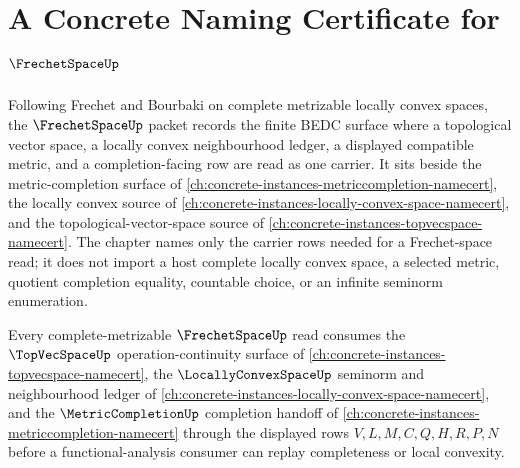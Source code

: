 \chapter{A Concrete Naming Certificate for $\FrechetSpaceUp$}
\label{ch:concrete-instances-frechet-space-namecert}

Following Frechet and Bourbaki on complete metrizable locally convex spaces, the $\FrechetSpaceUp$ packet records the finite BEDC surface where a topological vector space, a locally convex neighbourhood ledger, a displayed compatible metric, and a completion-facing row are read as one carrier. It sits beside the metric-completion surface of \autoref{ch:concrete-instances-metriccompletion-namecert}, the locally convex source of \autoref{ch:concrete-instances-locally-convex-space-namecert}, and the topological-vector-space source of \autoref{ch:concrete-instances-topvecspace-namecert}. The chapter names only the carrier rows needed for a Frechet-space read; it does not import a host complete locally convex space, a selected metric, quotient completion equality, countable choice, or an infinite seminorm enumeration.

Every complete-metrizable $\FrechetSpaceUp$ read consumes the $\TopVecSpaceUp$ operation-continuity surface of \autoref{ch:concrete-instances-topvecspace-namecert}, the $\LocallyConvexSpaceUp$ seminorm and neighbourhood ledger of \autoref{ch:concrete-instances-locally-convex-space-namecert}, and the $\MetricCompletionUp$ completion handoff of \autoref{ch:concrete-instances-metriccompletion-namecert} through the displayed rows $V,L,M,C,Q,H,R,P,N$ before a functional-analysis consumer can replay completeness or local convexity.

